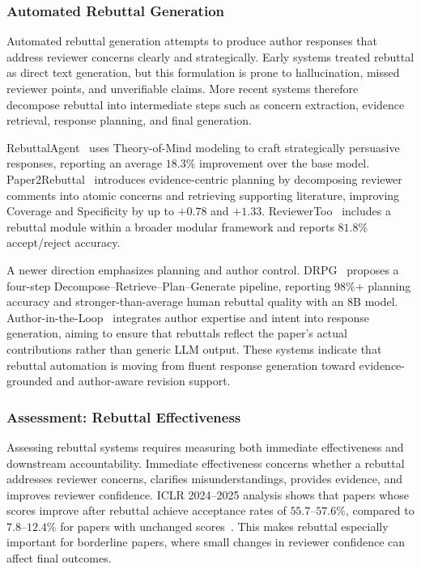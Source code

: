 \subsubsection{Automated Rebuttal Generation}
\label{sec:rebuttal_gen}

Automated rebuttal generation attempts to produce author responses that address reviewer concerns clearly and strategically. Early systems treated rebuttal as direct text generation, but this formulation is prone to hallucination, missed reviewer points, and unverifiable claims. More recent systems therefore decompose rebuttal into intermediate steps such as concern extraction, evidence retrieval, response planning, and final generation.

RebuttalAgent~\cite{rebuttalagent2026} uses Theory-of-Mind modeling to craft strategically persuasive responses, reporting an average $18.3\%$ improvement over the base model. Paper2Rebuttal~\cite{paper2rebuttal2026} introduces evidence-centric planning by decomposing reviewer comments into atomic concerns and retrieving supporting literature, improving Coverage and Specificity by up to $+0.78$ and $+1.33$. ReviewerToo~\cite{reviewertoo2025} includes a rebuttal module within a broader modular framework and reports $81.8\%$ accept/reject accuracy.

A newer direction emphasizes planning and author control. DRPG~\cite{drpg2026} proposes a four-step Decompose--Retrieve--Plan--Generate pipeline, reporting $98\%$+ planning accuracy and stronger-than-average human rebuttal quality with an $8$B model. Author-in-the-Loop~\cite{ruan2026authorinloop} integrates author expertise and intent into response generation, aiming to ensure that rebuttals reflect the paper's actual contributions rather than generic LLM output. These systems indicate that rebuttal automation is moving from fluent response generation toward evidence-grounded and author-aware revision support.



\subsubsection{Assessment: Rebuttal Effectiveness}
\label{sec:rebuttal_effectiveness}

Assessing rebuttal systems requires measuring both immediate effectiveness and downstream accountability. Immediate effectiveness concerns whether a rebuttal addresses reviewer concerns, clarifies misunderstandings, provides evidence, and improves reviewer confidence. ICLR 2024--2025 analysis shows that papers whose scores improve after rebuttal achieve acceptance rates of $55.7$--$57.6\%$, compared to $7.8$--$12.4\%$ for papers with unchanged scores~\cite{iclr_rebuttal2025}. This makes rebuttal especially important for borderline papers, where small changes in reviewer confidence can affect final outcomes.

